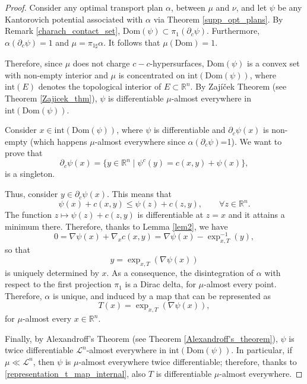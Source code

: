 \documentclass[reqno]{amsart}
\theoremstyle{plain}
\theoremstyle{definition}
\theoremstyle{remark}
\begin{document}
	\begin{proof}
        Consider any optimal transport plan $\alpha$, between $\mu$ and $\nu$, and let $\psi$ be any Kantorovich potential associated with $\alpha$ via Theorem \ref{supp_opt_plans}. By Remark \ref{charach_contact_set}, $\mathrm{Dom}(\psi) \subset \pi_1(\partial_c\psi)$. Furthermore, $\alpha(\partial_c\psi)=1$ and $\mu=\pi_{1\sharp}\alpha$. It follows that $\mu(\mathrm{Dom})=1$.
              
        Therefore, since $\mu$ does not charge $c-c$-hypersurfaces, $\mathrm{Dom}(\psi)$ is a convex set with non-empty interior and $\mu$ is concentrated on $\mathrm{int}(\mathrm{Dom}(\psi))$, where $\mathrm{int}(E)$ denotes the topological interior of $E\subset \mathbb{R}^n$. 
        By Zaj\'i\v cek Theorem (see Theorem \ref{Zajicek_thm}), $\psi$ is differentiable $\mu$-almost everywhere in $\mathrm{int}(\mathrm{Dom}(\psi))$.

		Consider $x\in \mathrm{int}(\mathrm{Dom}(\psi))$, where $\psi$ is differentiable and $\partial_c\psi(x)$ is non-empty (which happens $\mu$-almost everywhere since $\alpha(\partial_c\psi)$=1). We want to prove that 
		\begin{equation}
			\partial_c\psi(x)=\{y\in\mathbb{R}^n\;|\;\psi^c(y)=c(x,y)+\psi(x)\},
		\end{equation}
		is a singleton.
        
        Thus, consider $y\in\partial_c\psi(x)$. This means that 
		\begin{equation}
			\psi(x)+c(x,y)\leq\psi(z)+c(z,y),\qquad\forall z\in\mathbb{R}^n.
		\end{equation}
		The function $z\mapsto\psi(z)+c(z,y)$ is differentiable at $z=x$ and it attains a minimum there.
		Therefore, thanks to Lemma \ref{lem2}, we have 
		\begin{equation}
			0=\nabla\psi(x)+\nabla_x c(x,y)=\nabla\psi(x)-\exp_{x,T}^{-1}(y),
		\end{equation} 
		so that 
		\begin{equation}
			y=\exp_{x,T}(\nabla\psi(x))
		\end{equation}
		is uniquely determined by $x$. As a consequence, the disintegration of $\alpha$ with respect to the first projection $\pi_1$ is a Dirac delta, for $\mu$-almost every point. Therefore, $\alpha$ is unique, and induced by a map that can be represented as 	
		\begin{equation}\label{representation_t_map_internal}
			T(x)=\exp_{x,T}(\nabla\psi(x)),
		\end{equation}
	for $\mu$-almost every $x\in\mathbb{R}^n$.
        
        Finally, by Alexandroff's Theorem (see Theorem \ref{Alexandroff's_theorem}), $\psi$ is twice differentiable $\mathscr{L}^n$-almost everywhere in $\mathrm{int}(\mathrm{Dom}(\psi))$. In particular, if $\mu\ll\mathscr{L}^n$, then $\psi$ is $\mu$-almost everywhere twice differentiable; therefore, thanks to \eqref{representation_t_map_internal}, also $T$ is differentiable $\mu$-almost everywhere.
	\end{proof}
\end{document}
